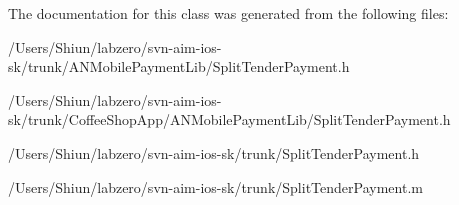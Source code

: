 The documentation for this class was generated from the following files:\begin{DoxyCompactItemize}
\item 
/Users/Shiun/labzero/svn-\/aim-\/ios-\/sk/trunk/ANMobilePaymentLib/SplitTenderPayment.h\item 
/Users/Shiun/labzero/svn-\/aim-\/ios-\/sk/trunk/CoffeeShopApp/ANMobilePaymentLib/SplitTenderPayment.h\item 
/Users/Shiun/labzero/svn-\/aim-\/ios-\/sk/trunk/SplitTenderPayment.h\item 
/Users/Shiun/labzero/svn-\/aim-\/ios-\/sk/trunk/SplitTenderPayment.m\end{DoxyCompactItemize}
